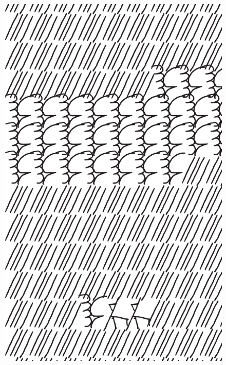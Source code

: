\makeatletter\@openrightfalse
\movetooddpage
\begin{absolutelynopagebreak}
\begin{vplace}
\begin{figure}[H]
\begin{adjustwidth}{-0.99cm}{}
  \centering
  \vspace*{-1.97cm}
  \hspace*{-0.65cm}
  \includegraphics[width=115mm]{./imgs/img6.pdf}  
  \hfill
\end{adjustwidth}

\thispagestyle{empty}

\end{figure}
\end{vplace}

\end{absolutelynopagebreak}

